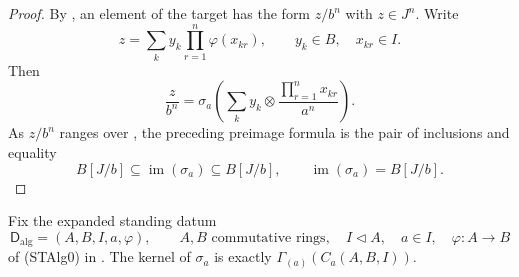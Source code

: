 \begin{proof}
  By , an element of the target has
  the form $z/b^n$ with $z\in J^n$.  Write
  \[
    z=\sum_k y_k\prod_{r=1}^n\varphi(x_{kr}),
    \qquad y_k\in B,\quad x_{kr}\in I.
  \]
  Then
  \[
    \frac z{b^n}
      =\sigma_a\left(
        \sum_k y_k\otimes
          \frac{\prod_{r=1}^nx_{kr}}{a^n}\right).
  \]
  As $z/b^n$ ranges over
  , the preceding preimage formula
  is the pair of inclusions and equality
  \[
    B[J/b]\subseteq\operatorname{im}(\sigma_a)
      \subseteq B[J/b],
    \qquad
    \operatorname{im}(\sigma_a)=B[J/b].
  \]
\end{proof}

\begin{lemma}
  \label{lemma:nagata-strict-chart-map-kernel}

  Fix the expanded standing datum
  \[
    \mathsf D_{\mathrm{alg}}=(A,B,I,a,\varphi),\qquad
    A,B\text{ commutative rings},\quad
    I\triangleleft A,\quad a\in I,\quad
    \varphi\colon A\to B
  \]
  of (STAlg0) in
  .
  The kernel of $\sigma_a$ is exactly
  $\Gamma_{(a)}(C_a(A,B,I))$.
\end{lemma}

